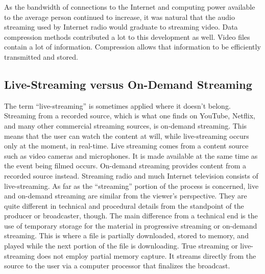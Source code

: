 \documentclass{article}
\begin{document}
As the bandwidth of connections to the Internet and computing power available to the average person continued to increase, it was natural that the audio streaming used by Internet radio would graduate to streaming video. Data compression methods contributed a lot to this development as well. Video files contain a lot of information. Compression allows that information to be efficiently transmitted and stored.

\subsection{Live-Streaming versus On-Demand Streaming}
The term “live-streaming” is sometimes applied where it doesn’t belong. Streaming from a recorded source, which is what one finds on YouTube, Netflix, and many other commercial streaming sources, is on-demand streaming. This means that the user can watch the content at will, while live-streaming occurs only at the moment, in real-time. Live streaming comes from a content source such as video cameras and microphones. It is made available at the same time as the event being filmed occurs. On-demand streaming provides content from a recorded source instead. Streaming radio and much Internet television consists of live-streaming.
As far as the “streaming” portion of the process is concerned, live and on-demand streaming are similar from the viewer’s perspective. They are quite different in technical and procedural details from the standpoint of the producer or broadcaster, though. The main difference from a technical end is the use of temporary storage for the material in progressive streaming or on-demand streaming. This is where a file is partially downloaded, stored to memory, and played while the next portion of the file is downloading. True streaming or live-streaming does not employ partial memory capture. It streams directly from the source to the user via a computer processor that finalizes the broadcast.
\end{document}
